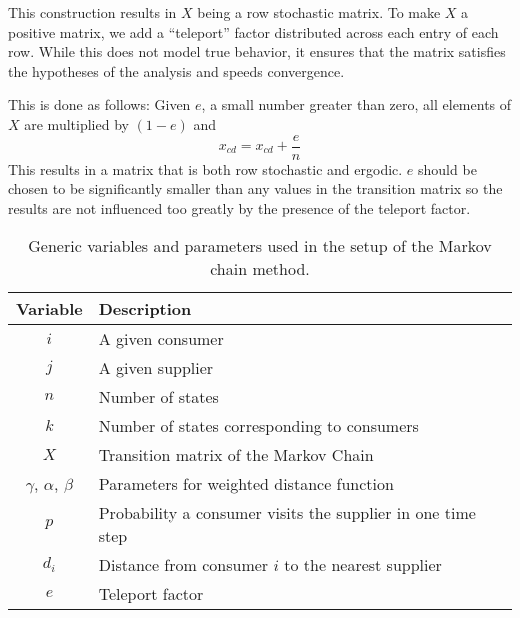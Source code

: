 \documentclass[twoside,twocolumn]{article}
\begin{document}
This construction results in $X$ being a row stochastic matrix.
To make $X$ a positive matrix, we add a ``teleport'' factor distributed across each entry of each row.
While this does not model true behavior, it ensures that the matrix satisfies the hypotheses of the analysis and speeds convergence.

This is done as follows:
Given $e$, a small number greater than zero, all elements of $X$ are multiplied by $(1-e)$ and 
$$x_{cd} = x_{cd} + \frac{e}{n}$$
This results in a matrix that is both row stochastic and ergodic.%
$e$ should be chosen to be significantly smaller than any values in the transition matrix so the results are not influenced too greatly by the presence of the teleport factor.
    
\begin{table}
\begin{tabular}{c | p{5cm}}
Variable & Description\\
\hline
$i$ & A given consumer\\
$j$ & A given supplier\\
$n$ & Number of states\\
$k$ & Number of states corresponding to consumers\\
$X$ & Transition matrix of the Markov Chain\\
$\gamma$, $\alpha$, $\beta$  & Parameters for weighted distance function\\
$p$ & Probability a consumer visits the supplier in one time step\\
$d_{i}$ & Distance from consumer $i$ to the nearest supplier\\
$e$ & Teleport factor
\end{tabular}
\caption{Generic variables and parameters used in the setup of the Markov chain method.}
\end{table}






\end{document}
